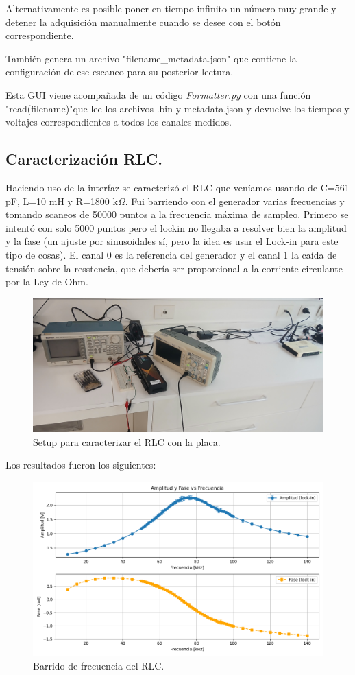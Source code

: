 Alternativamente es posible poner en tiempo infinito un número muy grande y detener la adquisición manualmente cuando se desee con el botón correspondiente. 

También genera un archivo "filename\_metadata.json" que contiene la configuración de ese escaneo para su posterior lectura. 

Esta GUI viene acompañada de un código \textit{Formatter.py} con una función "read(filename)"que lee los archivos .bin y metadata.json y devuelve los tiempos y voltajes correspondientes a todos los canales medidos. %

\subsection*{Caracterización RLC.}
Haciendo uso de la interfaz se caracterizó el RLC que veníamos usando de C=561 pF, L=10 mH y R=1800 k$\Omega$. Fui barriendo con el generador varias frecuencias y tomando scaneos de 50000 puntos a la frecuencia máxima de sampleo. Primero se intentó con solo 5000 puntos pero el lockin no llegaba a resolver bien la amplitud y la fase (un ajuste por sinusoidales sí, pero la idea es usar el Lock-in para este tipo de cosas). El canal 0 es la referencia del generador y el canal 1 la caída de tensión sobre la resstencia, que debería ser proporcional a la corriente circulante por la Ley de Ohm. %

\begin{figure}[th!]
	\centering
	\includegraphics[width=0.567\linewidth]{Figures/09_06_2025/Setup_RLC}
	\caption{Setup para caracterizar el RLC con la placa.}
	\label{fig:setuprlc}
\end{figure}

Los resultados fueron los siguientes: 

\begin{figure}[th!]
	\centering
	\includegraphics[width=0.87\linewidth]{Figures/09_06_2025/Barrido_RLC}
	\caption{Barrido de frecuencia del RLC.}
	\label{fig:barridorlc}
\end{figure}

